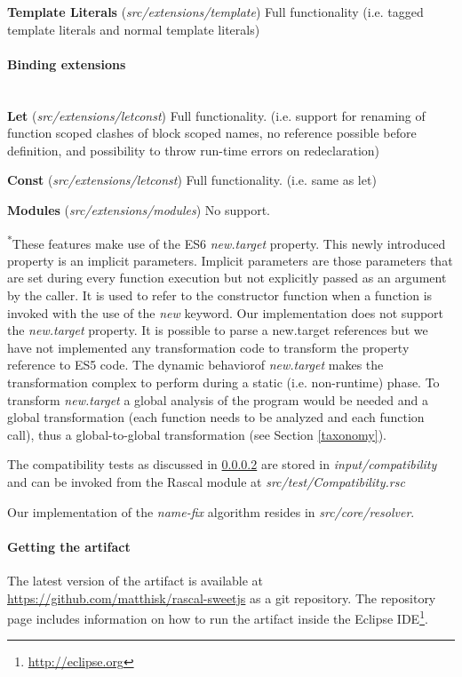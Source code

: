 \textbf{Template Literals} (\textit{src/extensions/template}) 
Full functionality (i.e. tagged template literals and normal template literals)

\paragraph{Binding extensions}\mbox{}\\
\textbf{Let} (\textit{src/extensions/letconst}) \newline
Full functionality. (i.e. support for renaming of function scoped clashes of block scoped names, no reference possible before definition, and possibility to throw run-time errors on redeclaration)

\textbf{Const} (\textit{src/extensions/letconst}) \newline
Full functionality. (i.e. same as let)

\textbf{Modules} (\textit{src/extensions/modules}) 
No support.

\textsuperscript{*}These features make use of the ES6 \textit{new.target} property. This newly introduced property is an implicit parameters. Implicit parameters are those parameters that are set during every function execution but not explicitly passed as an argument by the caller. It is used to refer to the constructor function when a function is invoked with the use of the \textit{new} keyword.
Our implementation does not support the \textit{new.target} property. It is possible to parse a new.target references but we have not implemented any transformation code to transform the property reference to ES5 code. The dynamic behavior\footnotemark of \textit{new.target} makes the transformation complex to perform during a static (i.e. non-runtime) phase. To transform \textit{new.target} a global analysis of the program would be needed and a global transformation (each function needs to be analyzed and each function call), thus a global-to-global transformation (see Section \ref{taxonomy}).


The compatibility tests as discussed in \ref{} are stored in \textit{input/compatibility} and can be invoked from the Rascal module at \textit{src/test/Compatibility.rsc}

Our implementation of the \textit{name-fix}\citep{Erdweg2014a} algorithm resides in \textit{src/core/resolver}. 

\paragraph{Getting the artifact}
The latest version of the artifact is available at \url{https://github.com/matthisk/rascal-sweetjs} as a git repository. The repository page includes information on how to run the artifact inside the Eclipse IDE\footnote{\url{http://eclipse.org}}.